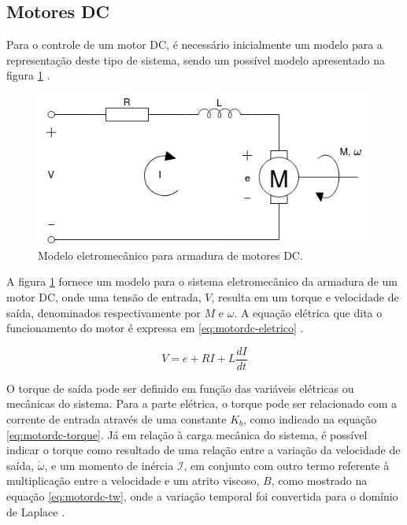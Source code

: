 \subsection{Motores DC}
Para o controle de um motor DC, é necessário inicialmente um modelo
para a representação deste tipo de sistema, sendo um possível modelo 
apresentado na figura \ref{fig:motordc} \cite{krishnan2001electric} \cite{maheriya2016review}.

\begin{figure}[h]
    \caption{Modelo eletromecânico para armadura de motores DC.}    

    \begin{centering}
        \includegraphics[width=0.6\columnwidth]{images/fundamentos/MotorDC.png} 
    \par\end{centering}

    \label{fig:motordc}
\end{figure}

A figura \ref{fig:motordc} fornece um modelo para o sistema eletromecânico
da armadura de um motor DC, onde uma tensão de entrada, $V$, resulta 
em um torque e velocidade de saída, denominados respectivamente por 
$M$ e $\omega$. A equação elétrica que dita o funcionamento do motor
é expressa em \ref{eq:motordc-eletrico} \cite{krishnan2001electric}.

\begin{equation}
    \label{eq:motordc-eletrico}
    V = e + RI + L \frac{dI}{dt}
\end{equation}

O torque de saída pode ser definido em função das variáveis elétricas ou mecânicas
do sistema. Para a parte elétrica, o torque pode ser relacionado com a corrente
de entrada através de uma constante $K_b$, como indicado na equação \ref{eq:motordc-torque}.
Já em relação à carga mecânica do sistema, é possível indicar o torque como resultado 
de uma relação entre a variação da velocidade de saída, $\dot{\omega}$, e um momento de 
inércia $\mathcal{I}$, em conjunto com outro termo referente à multiplicação entre a velocidade e  
um atrito viscoso, $B$, como mostrado na equação \ref{eq:motordc-tw}, onde a variação temporal
foi convertida para o domínio de Laplace \cite{krishnan2001electric}.


